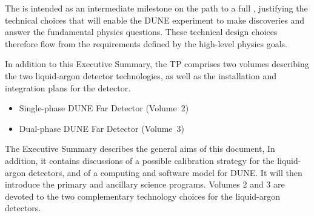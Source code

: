 The  is intended as an intermediate milestone on the path to a full , justifying the technical choices that will enable the DUNE experiment
to make discoveries and answer the %
fundamental physics questions. These technical design choices therefore flow from
the requirements defined by the high-level physics goals.

In addition to this Executive Summary, the TP comprises two volumes describing the two liquid-argon detector 
technologies, as well as the installation and integration plans for the detector.
\begin{itemize}
 \item Single-phase DUNE Far Detector (Volume~2)
 \item Dual-phase DUNE Far Detector (Volume~3)
\end{itemize}
The Executive Summary describes the general aims of this document, In addition, it contains discussions of a possible calibration strategy for the liquid-argon detectors, and of a computing and software model for DUNE. It will then introduce
the primary and ancillary science programs. Volumes 2 and 3 are devoted to the two complementary technology choices for the
liquid-argon detectors. 
